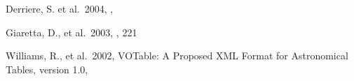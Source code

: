 \documentclass[11pt,twoside]{article}
\begin{document}








\begin{references}
 Derriere, S. et al.\ 2004, \adassxiii, 

Giaretta, D., %
et al.\ 2003,
\adassxii,
221

Williams, R., %
et al.\ 2002,
VOTable: A Proposed XML Format for Astronomical Tables, version 1.0,

\end{references}
\end{document}
